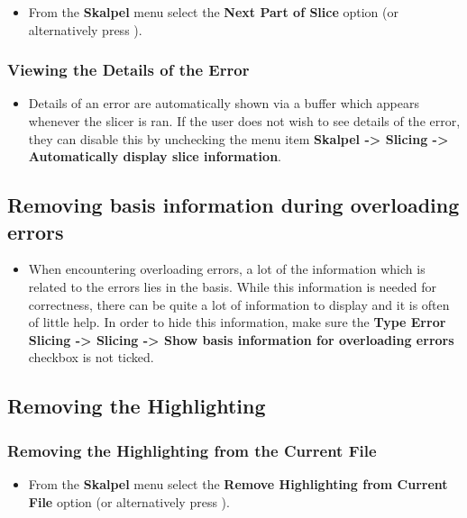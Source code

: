 \documentclass{report}
\begin{document}
\begin{itemize}
\item From the \textbf{Skalpel} menu select the \textbf{Next Part of
  Slice} option (or alternatively press ).
\end{itemize}

\subsubsection{Viewing the Details of the Error}

\begin{itemize}
\item Details of an error are automatically shown via a buffer which
  appears whenever the slicer is ran. If the user does not wish to see
  details of the error, they can disable this by unchecking the menu
  item \textbf{Skalpel -> Slicing -> Automatically display
    slice information}.
\end{itemize}

\subsection{Removing basis information during overloading errors}
\begin{itemize}
\item When encountering overloading errors, a lot of the information
  which is related to the errors lies in the basis. While this
  information is needed for correctness, there can be quite a lot of
  information to display and it is often of little help. In order to
  hide this information, make sure the \textbf{Type Error Slicing ->
    Slicing -> Show basis information for overloading errors} checkbox
  is not ticked.
\end{itemize}


\subsection{Removing the Highlighting}

\subsubsection{Removing the Highlighting from the Current File}

\begin{itemize}
\item From the \textbf{Skalpel} menu select the \textbf{Remove
  Highlighting from Current File} option (or alternatively press
  ).
\end{itemize}
\end{document}
